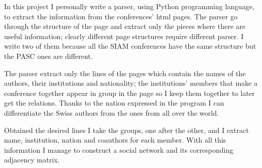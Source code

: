 \documentclass[]{usiinfbachelorproject}
\begin{document}
In this project I personally write a parser, using Python programming language, to extract the information from the conferences' html pages. The parser go through the structure of the page and extract only the pieces where there are useful information; clearly different page structures require different parser. I write two of them because  all the SIAM conferences have the same structure but the PASC ones are different.

The parser extract only the lines of the pages which contain the names of the authors, their institutions and nationality; the institutions' members that make a conference together appear in group in the page so I keep them together to later get the relations. Thanks to the nation expressed in the program I can differentiate the Swiss authors from the ones from all over the world. 

Obtained the desired lines I take the groups, one after the other, and I extract name, institution, nation and coauthors for each member. With all this information I manage to construct a social network and its corresponding adjacency matrix.
\end{document}
